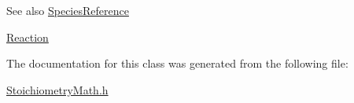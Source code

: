 \begin{DoxySeeAlso}{See also}
\hyperlink{class_species_reference}{Species\+Reference} 

\hyperlink{class_reaction}{Reaction} 
\end{DoxySeeAlso}


The documentation for this class was generated from the following file\+:\begin{DoxyCompactItemize}
\item 
\hyperlink{_stoichiometry_math_8h}{Stoichiometry\+Math.\+h}\end{DoxyCompactItemize}
